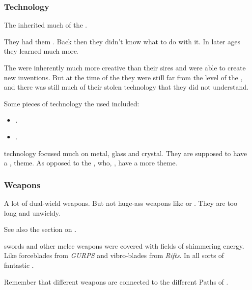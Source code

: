 \subsubsection{Technology}
The \resphain{} inherited much of the . 

They had them . 
Back then they didn't know what to do with it. 
In later ages they learned much more. 

The \resphain{} were inherently much more creative than their \bane{} sires and were able to create new inventions. 
But at the time of the \thirdbanewar they were still far from the level of the \voyagers, and there was still much of their stolen \voyager{} technology that they did not understand. 

Some pieces of technology the \resphain used included:
\begin{itemize}
  \item {}.
  \item {}.
\end{itemize}

\Resphan technology focused much on metal, glass and crystal.
They are supposed to have a ,  theme.
As opposed to the \dragons, who, , have a more  theme. 






\subsubsection{Weapons}
A lot of \resphain{} dual-wield weapons. 
But not huge-ass weapons like \senain{} or \belthradeth. 
They are too long and unwieldy. 

See also the section on . 

\Resphan swords and other melee weapons were covered with fields of shimmering energy.
Like forceblades from \emph{GURPS} and vibro-blades from \emph{Rifts}.
In all sorts of fantastic \colours. 

Remember that different weapons are connected to the different Paths of . 



